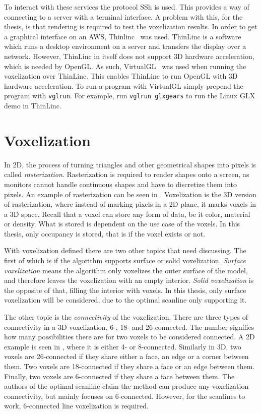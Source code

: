 To interact with these services the protocol SSh is used.
This provides a way of connecting to a server with a terminal interface.
A problem with this, for the thesis, is that rendering is required to test the voxelization results.
In order to get a graphical interface on an AWS, Thinlinc~\cite{thinlinc} was used.
ThinLinc is a software which runs a desktop environment on a server and transfers the display over a network.
However, ThinLinc in itself does not support 3D hardware acceleration, which is needed by OpenGL.
As such, VirtualGL~\cite{virtualgl} was used when running the voxelization over ThinLinc.
This enables ThinLinc to run OpenGL with 3D hardware acceleration.
To run a program with VirtualGL simply prepend the program with \texttt{vglrun}.
For example, run \texttt{vglrun glxgears} to run the Linux GLX demo in ThinLinc.

\section{Voxelization}
In 2D, the process of turning triangles and other geometrical shapes into pixels is called \textit{rasterization}. 
Rasterization is required to render shapes onto a screen, as monitors cannot handle continuous shapes and have to discretize them into pixels.
An example of rasterization can be seen in .
Voxelization is the 3D version of rasterization, where instead of marking pixels in a 2D plane, it marks voxels in a 3D space.
Recall that a voxel can store any form of data, be it color, material or density.
What is stored is dependent on the use case of the voxels. 
In this thesis, only occupancy is stored, that is if the voxel exists or not.



With voxelization defined there are two other topics that need discussing.
The first of which is if the algorithm supports surface or solid voxelization.
\textit{Surface voxelization} means the algorithm only voxelizes the outer surface of the model, and therefore leaves the voxelization with an empty interior.
\textit{Solid voxelization} is the opposite of that, filling the interior with voxels.
In this thesis, only surface voxelization will be considered, due to the optimal scanline only supporting it.

The other topic is the \textit{connectivity} of the voxelization.
There are three types of connectivity in a 3D voxelization, 6-, 18- and 26-connected.
The number signifies how many possibilities there are for two voxels to be considered connected.
A 2D example is seen in , where it is either 4- or 8-connected.
Similarly in 3D, two voxels are 26-connected if they share either a face, an edge or a corner between them.
Two voxels are 18-connected if they share a face or an edge between them.
Finally, two voxels are 6-connected if they share a face between them.
The authors of the optimal scanline claim the method can produce any voxelization connectivity, but mainly focuses on 6-connected. However, for the scanlines to work, 6-connected line voxelization is required.

